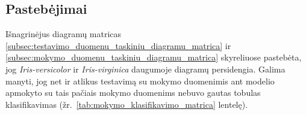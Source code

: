 \subsection{Pastebėjimai}
\label{subsec:klasifikavimo_tikimybiu_isvados}

Išnagrinėjus diagramų matricas \ref{subsec:testavimo_duomenu_taskiniu_diagramu_matrica} ir \ref{subsec:mokymo_duomenu_taskiniu_diagramu_matrica} skyreliuose pastebėta, jog \textit{Iris-versicolor} ir \textit{Iris-virginica} daugumoje diagramų persidengia. Galima manyti, jog net ir atlikus testavimą su mokymo duomenimis ant modelio apmokyto su tais pačiais mokymo duomenims nebuvo gautas tobulas klasifikavimas (žr.~\ref{tab:mokymo_klasifikavimo_matrica} lentelę).